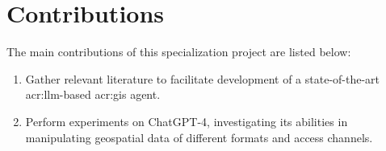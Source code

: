 \section{Contributions}
\label{sec:introContributions}

The main contributions of this specialization project are listed below:
\begin{enumerate}
    \item Gather relevant literature to facilitate development of a state-of-the-art \acrshort{acr:llm}-based \acrshort{acr:gis} agent.
    \item Perform experiments on ChatGPT-4, investigating its abilities in manipulating geospatial data of different formats and access channels.
\end{enumerate}

